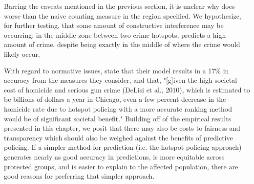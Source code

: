 Barring the caveats mentioned in the previous section, it is unclear why \pp does worse than the naive counting measure in the region specified. We hypothesize, for further testing, that some amount of constructive interference may be occurring: in the middle zone between two crime hotspots, \pp predicts a high amount of crime, despite being exactly in the middle of where the crime would likely occur.

With regard to normative issues, \citet{mohler_marked_2014} state that their model results in a 17\% in accuracy from the measures they consider, and that, "[g]iven the high societal cost of homicide and serious gun crime (DeLisi et al., 2010), which is estimated to be billions of dollars a year in Chicago, even a few percent decrease in the homicide rate due to hotspot policing with a more accurate ranking method would be of significant societal benefit." Building off of the empirical results presented in this chapter, we posit that there may also be costs to fairness and transparency which should also be weighed against the benefits of predictive policing. If a simpler method for prediction (i.e. the hotspot policing approach) generates nearly as good accuracy in predictions, is more equitable across protected groups, and is easier to explain to the affected population, there are good reasons for preferring that simpler approach.
